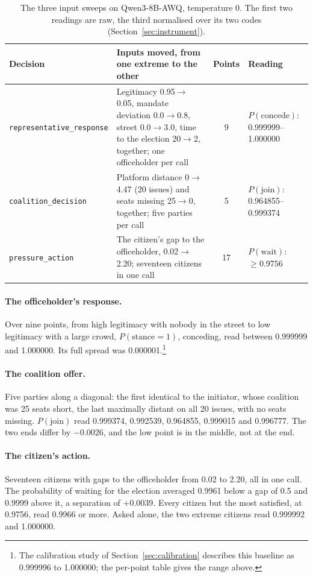 \documentclass[11pt]{article}
\newcommand{\code}[1]{\texttt{#1}}
\begin{document}
\begin{table}[t]
\centering\small
\begin{tabularx}{\linewidth}{@{}lXcl@{}}
\toprule
Decision & Inputs moved, from one extreme to the other & Points & Reading \\
\midrule
\code{representative\_response} &
  Legitimacy 0.95$\to$0.05, mandate deviation 0.0$\to$0.8, street 0.0$\to$3.0, time to the
  election 20$\to$2, together; one officeholder per call &
  9 & $P(\text{concede})$: 0.999999--1.000000 \\
\code{coalition\_decision} &
  Platform distance 0$\to$4.47 (20 issues) and seats missing 25$\to$0, together; five parties per
  call &
  5 & $P(\text{join})$: 0.964855--0.999374 \\
\code{pressure\_action} &
  The citizen's gap to the officeholder, 0.02$\to$2.20; seventeen citizens in one call &
  17 & $P(\text{wait})$: $\geq 0.9756$ \\
\bottomrule
\end{tabularx}
\caption{The three input sweeps on Qwen3-8B-AWQ, temperature 0. The first two readings are raw,
the third normalised over its two codes (Section~\ref{sec:instrument}).}
\label{tab:sweeps}
\end{table}

\paragraph{The officeholder's response.} Over nine points, from high legitimacy with nobody in the
street to low legitimacy with a large crowd, $P(\text{stance}=1)$, conceding, read between 0.999999
and 1.000000. Its full spread was 0.000001.\footnote{The calibration study of
Section~\ref{sec:calibration} describes this baseline as 0.999996 to 1.000000; the per-point table
gives the range above.}

\paragraph{The coalition offer.} Five parties along a diagonal: the first identical to the
initiator, whose coalition was 25 seats short, the last maximally distant on all 20 issues, with
no seats missing. $P(\text{join})$ read 0.999374, 0.992539, 0.964855, 0.999015 and 0.996777. The two
ends differ by $-0.0026$, and the low point is in the middle, not at the end.

\paragraph{The citizen's action.} Seventeen citizens with gaps to the officeholder from 0.02 to
2.20, all in one call. The probability of waiting for the election averaged 0.9961 below a gap of
0.5 and 0.9999 above it, a separation of $+0.0039$. Every citizen but the most satisfied, at
0.9756, read 0.9966 or more. Asked alone, the two extreme citizens read 0.999992 and 1.000000.
\end{document}
